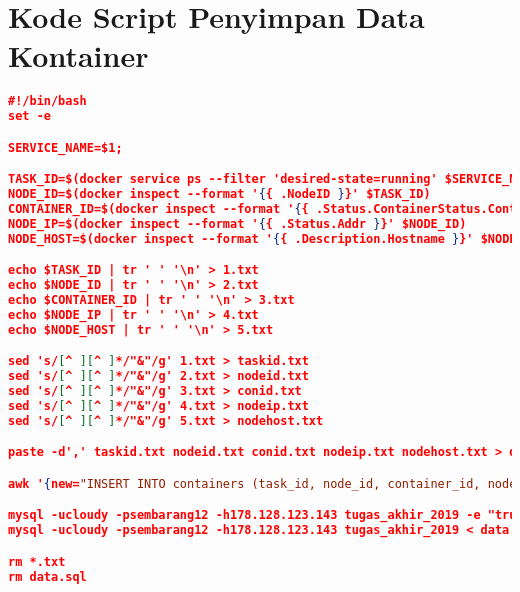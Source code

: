 \section*{Kode Script Penyimpan Data Kontainer} \label{scriptsh}

\begin{lstlisting}[frame=single,tabsize=2,breaklines,caption={Isi berkas save\_containers.sh},label=containersh, captionpos=b, language=json]
#!/bin/bash
set -e

SERVICE_NAME=$1;

TASK_ID=$(docker service ps --filter 'desired-state=running' $SERVICE_NAME -q)
NODE_ID=$(docker inspect --format '{{ .NodeID }}' $TASK_ID)
CONTAINER_ID=$(docker inspect --format '{{ .Status.ContainerStatus.ContainerID }}' $TASK_ID)
NODE_IP=$(docker inspect --format '{{ .Status.Addr }}' $NODE_ID)
NODE_HOST=$(docker inspect --format '{{ .Description.Hostname }}' $NODE_ID)

echo $TASK_ID | tr ' ' '\n' > 1.txt
echo $NODE_ID | tr ' ' '\n' > 2.txt
echo $CONTAINER_ID | tr ' ' '\n' > 3.txt
echo $NODE_IP | tr ' ' '\n' > 4.txt
echo $NODE_HOST | tr ' ' '\n' > 5.txt

sed 's/[^ ][^ ]*/"&"/g' 1.txt > taskid.txt
sed 's/[^ ][^ ]*/"&"/g' 2.txt > nodeid.txt
sed 's/[^ ][^ ]*/"&"/g' 3.txt > conid.txt
sed 's/[^ ][^ ]*/"&"/g' 4.txt > nodeip.txt
sed 's/[^ ][^ ]*/"&"/g' 5.txt > nodehost.txt

paste -d',' taskid.txt nodeid.txt conid.txt nodeip.txt nodehost.txt > data.txt

awk '{new="INSERT INTO containers (task_id, node_id, container_id, node_ip, node_host) VALUES ("$1");"; print new}' data.txt > data.sql

mysql -ucloudy -psembarang12 -h178.128.123.143 tugas_akhir_2019 -e "truncate table tugas_akhir_2019.containers"
mysql -ucloudy -psembarang12 -h178.128.123.143 tugas_akhir_2019 < data.sql

rm *.txt
rm data.sql
\end{lstlisting}